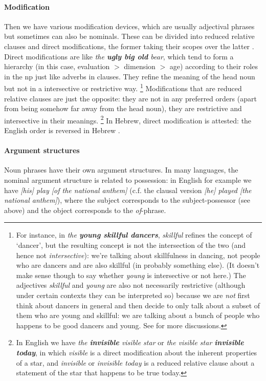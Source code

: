 \documentclass[a4paper, oneside, 12pt]{report}
\newcommand*{\textgt}{$>$ }
\newcommand{\form}[1]{\emph{#1}}
\newcommand{\translate}[1]{`#1'}
\begin{document}
\paragraph*{Modification}
Then we have various modification devices,
which are usually adjectival phrases but sometimes can also be nominals.
These can be divided into reduced relative clauses and direct modifications,
the former taking their scopes over the latter \citep{cinque2010syntax}.
Direct modifications are like \form{the \textbf{ugly big old} bear},
which tend to form a hierarchy (in this case, evaluation \textgt dimension \textgt age) according to their roles in the \ac{np} just like adverbs in clauses.
They refine the meaning of the head noun but not in a intersective or restrictive way.%
\footnote{
    For instance, in \form{the \textbf{young skillful dancers}},
    \form{skillful} refines the concept of \translate{dancer},
    but the resulting concept is not the intersection of the two
    (and hence not \emph{intersective}):
    we're talking about skillfulness in dancing,
    not people who are dancers and are also skillful (in probably something else).
    (It doesn't make sense though to say whether \form{young} is intersective or not here.)
    The adjectives \form{skillful} and \form{young} are also not necessarily restrictive
    (although under certain contexts they can be interpreted so)
    because we are \emph{not} first think about dancers in general
    and then decide to only talk about a subset of them who are young and skillful:
    we are talking about a bunch of people who happens to be good dancers and young.
    See \citet{cinque2010syntax} for more discussions.
}
Modifications that are reduced relative clauses are just the opposite:
they are not in any preferred orders (apart from being somehow far away from the head noun),
they are restrictive and intersective in their meanings.%
\footnote{
    In English we have \form{the \textbf{invisible} visible star}
    or \form{the visible star \textbf{invisible today}},
    in which \form{visible} is a direct modification about the inherent properties of a star,
    and \form{invisible} or \form{invisible today} is a reduced relative clause
    about a statement of the star that happens to be true today.
}
In Hebrew, direct modification is attested:
the English order is reversed in Hebrew \citep{shlonsky2012some}.

\paragraph*{Argument structures}
Noun phrases have their own argument structures.
In many languages, the nominal argument structure is related to possession:
in English for example we have \form{[his] play [of the national anthem]}
(c.f. the clausal version \form{[he] played [the national anthem]}),
where the subject corresponds to the subject-possessor (see above)
and the object corresponds to the \form{of}-phrase.
\end{document}
